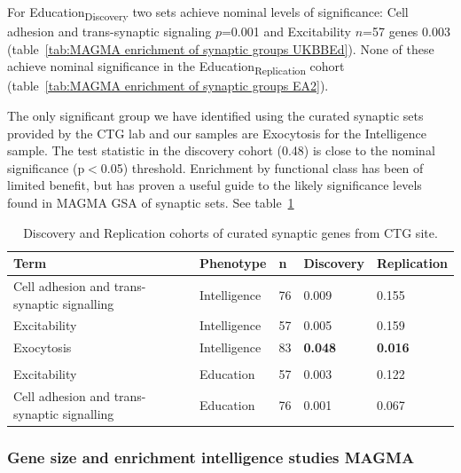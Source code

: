 For Education\textsubscript{Discovery} two sets achieve nominal levels of significance: Cell adhesion and trans-synaptic signaling $p$=0.001 and Excitability $n$=57 genes 0.003 (table~\ref{tab:MAGMA enrichment of synaptic groups UKBBEd}). None of these achieve nominal significance in the Education\textsubscript{Replication} cohort (table~\ref{tab:MAGMA enrichment of synaptic groups EA2}). 

The only significant group we have identified using the curated synaptic sets provided by the CTG lab and our samples are Exocytosis for the Intelligence sample. The test statistic in the discovery cohort (0.48) is close to the nominal significance (p$<$0.05) threshold. Enrichment by functional class has been of limited benefit, but has proven a useful guide to the likely significance levels found in MAGMA GSA of synaptic sets. See table~\ref{tab:curated synaptic discovery and replication} 




\begin{table}[]
    \centering
     \setlength{\extrarowheight}{2pt}
    \begin{tabular}{lllll}
    \toprule
      Term   & Phenotype & n & Discovery & Replication  \\
      \midrule
         Cell adhesion and trans-synaptic signalling & Intelligence& 76  & 0.009 & 0.155\\
         Excitability & Intelligence& 57  & 0.005 & 0.159\\
          Exocytosis & Intelligence&83  & \textbf{0.048} & \textbf{0.016}  \\ 
          \\
           Excitability & Education & 57 & 0.003 &  0.122\\ 
           Cell adhesion and trans-synaptic signalling & Education & 76 & 0.001 & 0.067 \\ 
           \bottomrule
           
    \end{tabular}
    \caption{Discovery and Replication cohorts of curated synaptic genes from CTG site. }
    \label{tab:curated synaptic discovery and replication}
\end{table}


\subsubsection{Gene size and enrichment intelligence studies MAGMA}

